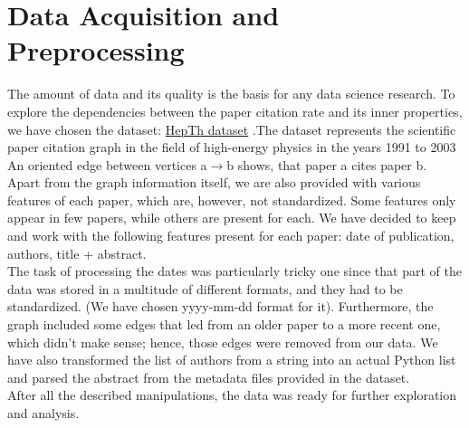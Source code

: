 \documentclass{article}
\newcommand\tab[1][1cm]{\hspace*{#1}}
\begin{document}
\section{Data Acquisition and Preprocessing}

\tab	The amount of data and its quality is the basis for any data science research. To explore the dependencies between the paper citation rate and its inner properties, we have chosen the dataset: \href{https://www.kaggle.com/datasets/wolfram77/graphs-snap-cit}{HepTh dataset} .The dataset represents the scientific paper citation graph in the field of high-energy physics in the years 1991 to 2003 \\
\tab	 An oriented edge between vertices a$\rightarrow$b shows, that paper a cites paper b. Apart from the graph information itself, we are also provided with various features of each paper, which are, however, not standardized. Some features only appear in few papers, while others are present for each. We have decided to keep and work with the following features present for each paper: date of publication, authors, title + abstract. \\
\tab	The task of processing the dates was particularly tricky one since that part of the data was stored in a multitude of different formats, and they had to be standardized. (We have chosen yyyy-mm-dd format for it). Furthermore, the graph included some edges that led from an older paper to a more recent one, which didn't make sense; hence, those edges were removed from our data. We have also transformed the list of authors from a string into an actual Python list and parsed the abstract from the metadata files provided in the dataset. \\
\tab	After all the described manipulations, the data was ready for further exploration and analysis. \\
\end{document}
